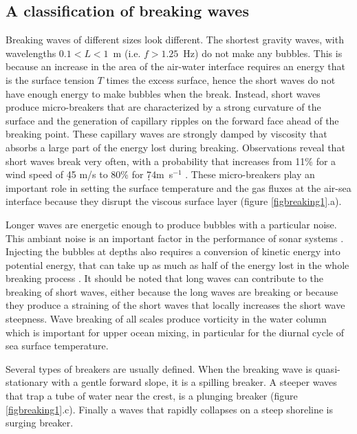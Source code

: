 \subsection{A classification of breaking waves}
Breaking waves of different sizes look different. The shortest gravity waves, with wavelengths $0.1 <
L < 1$~m (i.e.  $f > 1.25$~Hz) do not make any bubbles. This is because an increase in the area of the  air-water
interface requires an energy that is the surface tension $T$ times the excess surface, hence the short waves do not have enough energy to make bubbles 
when the break. Instead, short waves produce micro-breakers \citep{Banner&Phillips1974}
that are characterized by a strong curvature of the surface and the generation of capillary ripples on the forward face ahead of the breaking point.  
These capillary waves are strongly damped by viscosity that absorbs a large part of the energy lost during breaking. 
Observations reveal that short waves break very often, with a probability that increases from  11\% for a wind speed of 4{\d}5 m/s to 80\% for 7{\d}4m~s$^{-1}$
\citep{Siddiqui&Loewen2007}.
These micro-breakers play an important role in setting the surface temperature and the gas fluxes at the air-sea interface because they disrupt the viscous surface layer (figure \ref{figbreaking1}.a).

Longer waves are energetic enough to produce bubbles with a particular noise. This ambiant noise is an important factor 
in the performance of sonar systems \citep[e.g.][]{Lu&al.1990,Ma&al.2005}. Injecting the bubbles at depths also requires a conversion of kinetic 
energy into potential energy, that can take up as much as half of the energy lost in the whole breaking process \citep{Lamarre&Melville1991}. It should be noted
that long waves can contribute to the breaking of short waves, either because the long waves are breaking or because they produce a 
straining of the short waves that locally increases the short wave steepness.
Wave breaking of all scales produce vorticity in the water column which is important for upper ocean mixing, in particular for the diurnal cycle of sea surface 
temperature. 

Several types of breakers are usually defined. When the breaking wave is quasi-stationary 
with a gentle forward slope, it is a spilling breaker. A steeper waves that trap a tube of water near the crest, is a plunging breaker (figure
\ref{figbreaking1}.c). Finally a waves that rapidly collapses on a steep shoreline is surging breaker. 



